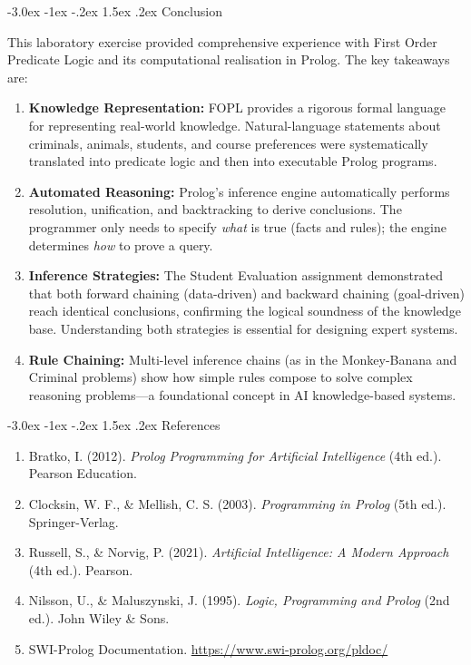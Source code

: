 \documentclass[12pt,a4paper]{article}
\makeatletter
\renewcommand{\section}{\@startsection{section}{1}{\z@}%
  {-3.0ex \@plus -1ex \@minus -.2ex}%
  {1.5ex \@plus.2ex}%
  {\normalfont\Large\bfseries\color{primaryblue}}}
\makeatother
\begin{document}
\section{Conclusion}

This laboratory exercise provided comprehensive experience with First Order Predicate Logic and its computational realisation in Prolog. The key takeaways are:

\begin{enumerate}
  \item \textbf{Knowledge Representation:} FOPL provides a rigorous formal language for representing real-world knowledge. Natural-language statements about criminals, animals, students, and course preferences were systematically translated into predicate logic and then into executable Prolog programs.

  \item \textbf{Automated Reasoning:} Prolog's inference engine automatically performs resolution, unification, and backtracking to derive conclusions. The programmer only needs to specify \emph{what} is true (facts and rules); the engine determines \emph{how} to prove a query.

  \item \textbf{Inference Strategies:} The Student Evaluation assignment demonstrated that both forward chaining (data-driven) and backward chaining (goal-driven) reach identical conclusions, confirming the logical soundness of the knowledge base. Understanding both strategies is essential for designing expert systems.

  \item \textbf{Rule Chaining:} Multi-level inference chains (as in the Monkey-Banana and Criminal problems) show how simple rules compose to solve complex reasoning problems---a foundational concept in AI knowledge-based systems.
\end{enumerate}

\section{References}
\begin{enumerate}
  \item Bratko, I. (2012). \textit{Prolog Programming for Artificial Intelligence} (4th ed.). Pearson Education.
  \item Clocksin, W. F., \& Mellish, C. S. (2003). \textit{Programming in Prolog} (5th ed.). Springer-Verlag.
  \item Russell, S., \& Norvig, P. (2021). \textit{Artificial Intelligence: A Modern Approach} (4th ed.). Pearson.
  \item Nilsson, U., \& Maluszynski, J. (1995). \textit{Logic, Programming and Prolog} (2nd ed.). John Wiley \& Sons.
  \item SWI-Prolog Documentation. \url{https://www.swi-prolog.org/pldoc/}
\end{enumerate}
\end{document}
